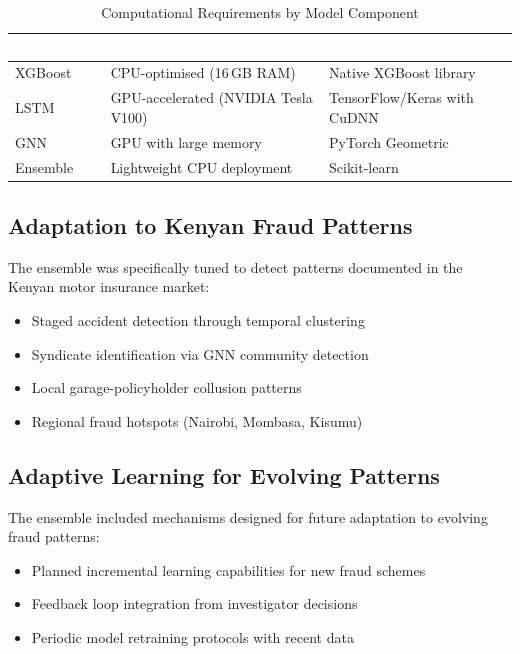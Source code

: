 \documentclass[12pt,a4paper,oneside]{report}
\numberwithin{equation}{chapter}
\renewcommand{\arraystretch}{1.6}
\begin{document}
\begin{table}[H]
\centering
\caption{Computational Requirements by Model Component}
\label{tab:computational-requirements}
\renewcommand{\arraystretch}{1.4}
\begin{tabular}{L{3cm} L{5cm} L{5cm}}
\toprule
{}
\textcolor{white}{\textbf{Component}} &
\textcolor{white}{\textbf{Hardware Requirements}} &
\textcolor{white}{\textbf{Software Stack}} \\
\midrule
{}
XGBoost  & CPU-optimised (16\,GB RAM)             & Native XGBoost library \\
LSTM     & GPU-accelerated (NVIDIA Tesla V100)    & TensorFlow/Keras with CuDNN \\
GNN      & GPU with large memory                  & PyTorch Geometric \\
Ensemble & Lightweight CPU deployment              & Scikit-learn \\
\bottomrule
\end{tabular}
\end{table}

\subsection{Adaptation to Kenyan Fraud Patterns}

The ensemble was specifically tuned to detect patterns documented in the Kenyan motor insurance
market:
\begin{itemize}
    \item Staged accident detection through temporal clustering
    \item Syndicate identification via GNN community detection
    \item Local garage-policyholder collusion patterns
    \item Regional fraud hotspots (Nairobi, Mombasa, Kisumu)
\end{itemize}

\subsection{Adaptive Learning for Evolving Patterns}

The ensemble included mechanisms designed for future adaptation to evolving fraud patterns:
\begin{itemize}
    \item Planned incremental learning capabilities for new fraud schemes
    \item Feedback loop integration from investigator decisions
    \item Periodic model retraining protocols with recent data
\end{itemize}
\end{document}
